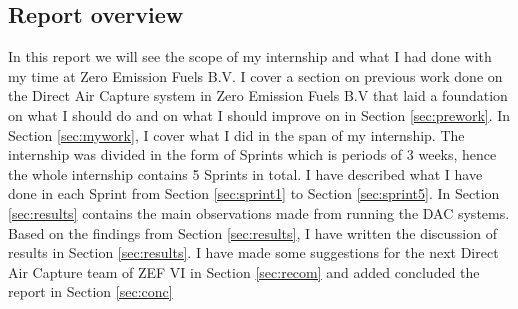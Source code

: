 \subsection{Report overview}

In this report we will see the scope of my internship and what I had done with my time at Zero Emission Fuels B.V. I cover a section on previous work done on the Direct Air Capture system in Zero Emission Fuels B.V that laid a foundation on what I should do and on what I should improve on in Section \ref{sec:prework}. In Section \ref{sec:mywork}, I cover what I did in the span of my internship. The internship was divided in the form of Sprints which is periods of 3 weeks, hence the whole internship contains 5 Sprints in total. I have described what I have done in each Sprint from Section \ref{sec:sprint1} to Section \ref{sec:sprint5}. In Section \ref{sec:results} contains the main observations made from running the DAC systems. Based on the findings from Section \ref{sec:results}, I have written the discussion of results in Section \ref{sec:results}. I have made some suggestions for the next Direct Air Capture team of ZEF VI in Section \ref{sec:recom} and added concluded the report in Section \ref{sec:conc}